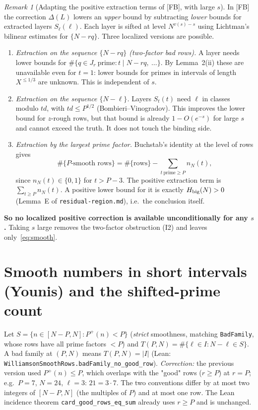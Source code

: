 \documentclass[11pt,a4paper]{article}
\theoremstyle{remark}
\newtheorem{remark}[proposition]{Remark}
\begin{document}
\begin{remark}[Adapting the positive extraction terms of {[FB]}, with large $s$]
In [FB] the correction $\Delta(L)$ lowers an \emph{upper} bound by subtracting \emph{lower} bounds for
extracted layers $S_\ell(\ell)$. Each layer is sifted at level $N^{v(s)-s}$ using Lichtman's bilinear
estimates for $\{N-rq\}$. Three localized versions are possible.
\begin{enumerate}
\item \emph{Extraction on the sequence $\{N-rq\}$ (two-factor bad rows).} A layer needs lower bounds for
$\#\{q\in J_r\ \text{prime}: t\mid N-rq,\ \dots\}$. By Lemma~2(ii) these are unavailable even for $t=1$:
lower bounds for primes in intervals of length $X^{\le1/3}$ are unknown. This is independent of $s$.
\item \emph{Extraction on the sequence $\{N-\ell\}$.} Layers $S_t(t)$ need $\ell$ in classes modulo $td$, with
$td\le P^{1/2}$ (Bombieri--Vinogradov). This improves the lower bound for $z$-rough rows, but that bound is
already $1-O(e^{-s})$ for large $s$ and cannot exceed the truth. It does not touch the binding side.
\item \emph{Extraction by the largest prime factor.} Buchstab's identity at the level of rows gives
\[
\#\{\text{$P$-smooth rows}\}=\#\{\text{rows}\}-\sum_{t\ \mathrm{prime}\ge P}n_N(t),
\]
since $n_N(t)\in\{0,1\}$ for $t>P-3$. The positive extraction term is $\sum_{t\ge P}n_N(t)$. A positive
lower bound for it is exactly $H_{\rm big}(N)>0$ (Lemma~E of \texttt{residual-region.md}), i.e.\ the
conclusion itself.
\end{enumerate}
\textbf{So no localized positive correction is available unconditionally for any $s$.} Taking $s$ large
removes the two-factor obstruction (I2) and leaves only~\eqref{eq:smooth}.
\end{remark}


\section{Smooth numbers in short intervals (Younis) and the shifted-prime count}

Let $S=\{n\in[N-P,N]: P^+(n)<P\}$ (\emph{strict} smoothness, matching \texttt{BadFamily}, whose rows
have all prime factors $<P$) and $T(P,N)=\#\{\ell\in I: N-\ell\in S\}$. A bad family at $(P,N)$ means
$T(P,N)=|I|$ (Lean: \texttt{WilliamsonSmoothRows.badFamily\_no\_good\_row}). \emph{Correction:} the previous
version used $P^+(n)\le P$, which overlaps with the "good" rows ($r\ge P$) at $r=P$; e.g.\ $P=7$, $N=24$,
$\ell=3$: $21=3\cdot7$. The two conventions differ by at most two integers of $[N-P,N]$ (the multiples of $P$)
and at most one row. The Lean incidence theorem \texttt{card\_good\_rows\_eq\_sum} already uses $r\ge P$ and is
unchanged.
\end{document}
